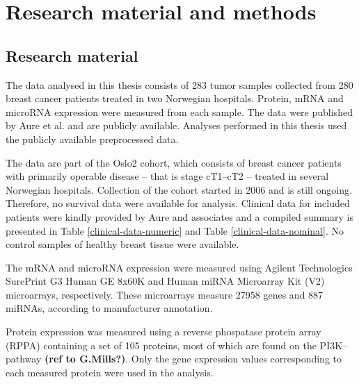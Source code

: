 

\section{Research material and methods}\label{material-and-methods}

\subsection{Research material}

The data analysed in this thesis consists of 283 tumor samples collected from
280 breast cancer patients treated in two Norwegian hospitals. Protein, mRNA
and microRNA expression were measured from each sample. The data were
published by Aure et al. \citep{Aure2015} and are publicly available. Analyses
performed in this thesis used the publicly available preprocessed data.

The data are part of the Oslo2 cohort, which consists of breast cancer
patients with primarily operable disease -- that is stage cT1--cT2 -- treated
in several Norwegian hospitals. Collection of the cohort started in 2006 and
is still ongoing. Therefore, no survival data were available for analysis.
Clinical data for included patients were kindly provided by Aure and
associates and a compiled summary is presented in Table
\ref{clinical-data-numeric} and Table \ref{clinical-data-nominal}.
No control samples of healthy breast tissue were available.



The mRNA and microRNA expression were measured using Agilent Technologies
SurePrint G3 Human GE 8x60K and Human miRNA Microarray Kit (V2) microarrays,
respectively. These microarrays measure 27958 genes and 887 miRNAs, according to
manufacturer annotation.

Protein expression was measured using a reverse phospatase protein array
(RPPA) containing a set of 105 proteins, most of which are found on the PI3K--
pathway \textbf{(ref to G.Mills?)}. Only the gene expression values
corresponding to each measured protein were used in the analysis.






